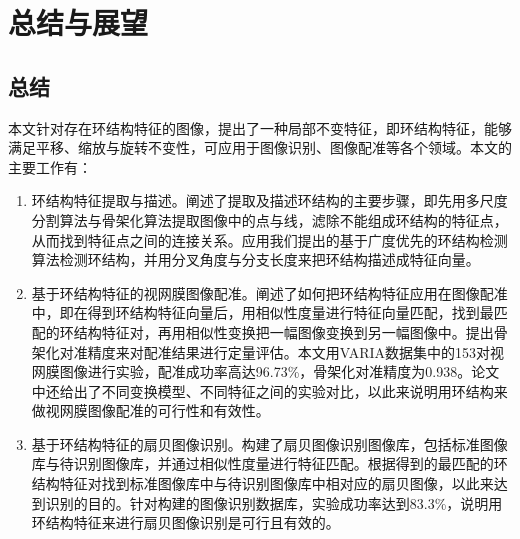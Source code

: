 

\chapter{总结与展望}
\label{cha:intro}

\section{总结}
\label{}
本文针对存在环结构特征的图像，提出了一种局部不变特征，即环结构特征，能够满足平移、缩放与旋转不变性，可应用于图像识别、图像配准等各个领域。本文的主要工作有：
\begin{enumerate}
\item 环结构特征提取与描述。阐述了提取及描述环结构的主要步骤，即先用多尺度分割算法与骨架化算法提取图像中的点与线，滤除不能组成环结构的特征点，从而找到特征点之间的连接关系。应用我们提出的基于广度优先的环结构检测算法检测环结构，并用分叉角度与分支长度来把环结构描述成特征向量。

\item 基于环结构特征的视网膜图像配准。阐述了如何把环结构特征应用在图像配准中，即在得到环结构特征向量后，用相似性度量进行特征向量匹配，找到最匹配的环结构特征对，再用相似性变换把一幅图像变换到另一幅图像中。提出骨架化对准精度来对配准结果进行定量评估。本文用VARIA数据集中的153对视网膜图像进行实验，配准成功率高达96.73\%，骨架化对准精度为0.938。论文中还给出了不同变换模型、不同特征之间的实验对比，以此来说明用环结构来做视网膜图像配准的可行性和有效性。

\item 基于环结构特征的扇贝图像识别。构建了扇贝图像识别图像库，包括标准图像库与待识别图像库，并通过相似性度量进行特征匹配。根据得到的最匹配的环结构特征对找到标准图像库中与待识别图像库中相对应的扇贝图像，以此来达到识别的目的。针对构建的图像识别数据库，实验成功率达到83.3\%，说明用环结构特征来进行扇贝图像识别是可行且有效的。
\end{enumerate}

